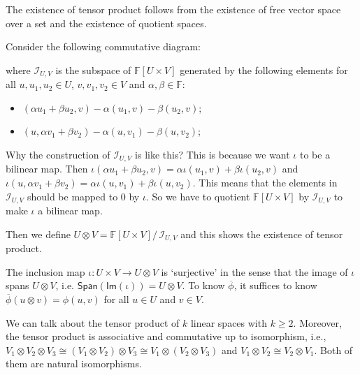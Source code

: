 \documentclass[
	11pt, %
	fleqn, %
	a4paper, %
]{LegrandOrangeBook}
\renewcommand{\Im}[1]{\mathsf{Im}(#1)} %
\renewcommand{\span}[1]{\mathsf{Span}(#1)} %
\renewcommand{\bar}[1]{\overline{#1}} %
\newcommand{\quotient}[2]{#1/\, #2} %
\newcommand{\F}{\mathbb{F}} %
\newcommand{\ideal}{\mathcal{I}} %
\begin{document}
The existence of tensor product follows from the existence of free vector space over a set and the existence of quotient spaces. 

Consider the following commutative diagram:
\begin{center}
\end{center}
where $\ideal_{U, V}$ is the subspace of $\F[U \times V]$ generated by the following elements for all $u, u_1, u_2 \in U$, $v, v_1, v_2 \in V$ and $\alpha, \beta \in \F$:
\begin{itemize}
    \item $(\alpha u_1 + \beta u_2, v) - \alpha (u_1, v) - \beta (u_2, v)$;
    \item $(u, \alpha v_1 + \beta v_2) - \alpha (u, v_1) - \beta (u, v_2)$;
\end{itemize}
Why the construction of $\ideal_{U, V}$ is like this? This is because we want $\iota$ to be a bilinear map. Then $\iota(\alpha u_1 + \beta u_2, v) = \alpha \iota(u_1, v) + \beta \iota(u_2, v)$ and $\iota(u, \alpha v_1 + \beta v_2) = \alpha \iota(u, v_1) + \beta \iota(u, v_2)$. This means that the elements in $\ideal_{U, V}$ should be mapped to $0$ by $\iota$. So we have to quotient $\F[U \times V]$ by $\ideal_{U, V}$ to make $\iota$ a bilinear map.

Then we define $U \otimes V = \quotient{\F[U \times V]}{\ideal_{U, V}}$ and this shows the existence of tensor product.

\begin{remark}
    The inclusion map $\iota : U \times V \to U \otimes V$ is `surjective' in the sense that the image of $\iota$ spans $U \otimes V$, i.e. $\span{\Im{\iota}} = U \otimes V$. To know $\bar{\phi}$, it suffices to know $\bar{\phi}(u \otimes v) = \phi(u, v)$ for all $u \in U$ and $v \in V$.
\end{remark}

We can talk about the tensor product of $k$ linear spaces with $k \geq 2$. Moreover, the tensor product is associative and commutative up to isomorphism, i.e., $V_1 \otimes V_2 \otimes V_3 \cong (V_1 \otimes V_2) \otimes V_3 \cong V_1 \otimes (V_2 \otimes V_3)$ and $V_1 \otimes V_2 \cong V_2 \otimes V_1$. Both of them are natural isomorphisms.
\end{document}
